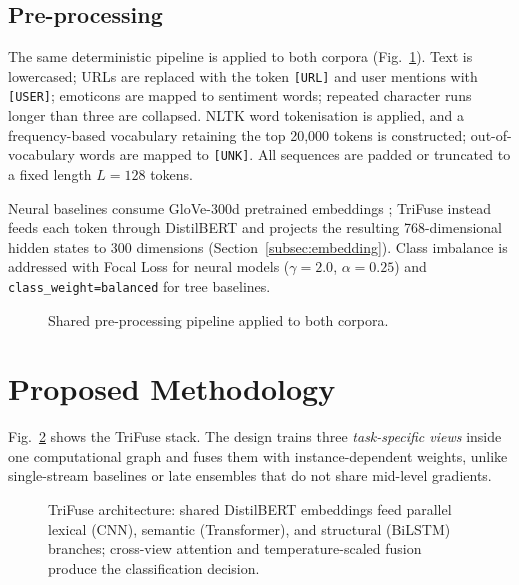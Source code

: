 \documentclass[10pt,twocolumn,a4paper]{article}
\begin{document}
\subsection{Pre-processing}\label{subsec:preprocessing}

The same deterministic pipeline is applied to both corpora (Fig.~\ref{fig:preprocessing}). Text is lowercased; URLs are replaced with the token \texttt{[URL]} and user mentions with \texttt{[USER]}; emoticons are mapped to sentiment words; repeated character runs longer than three are collapsed. NLTK word tokenisation is applied, and a frequency-based vocabulary retaining the top 20,000 tokens is constructed; out-of-vocabulary words are mapped to \texttt{[UNK]}. All sequences are padded or truncated to a fixed length $L{=}128$ tokens.

Neural baselines consume GloVe-300d pretrained embeddings \citep{ref29}; TriFuse instead feeds each token through DistilBERT and projects the resulting 768-dimensional hidden states to 300 dimensions (Section~\ref{subsec:embedding}). Class imbalance is addressed with Focal Loss \citep{ref23} for neural models ($\gamma{=}2.0$, $\alpha{=}0.25$) and \texttt{class\_weight=balanced} for tree baselines.

\begin{figure}[!t]
\centering

\caption{Shared pre-processing pipeline applied to both corpora.}
\label{fig:preprocessing}
\end{figure}

\section{Proposed Methodology}\label{sec:method}

Fig.~\ref{fig:architecture} shows the TriFuse stack. The design trains three \emph{task-specific views} inside one computational graph and fuses them with instance-dependent weights, unlike single-stream baselines \citep{ref7,ref8} or late ensembles \citep{ref14} that do not share mid-level gradients.

\begin{figure}[!t]
\centering

\caption{TriFuse architecture: shared DistilBERT embeddings feed parallel lexical (CNN), semantic (Transformer), and structural (BiLSTM) branches; cross-view attention and temperature-scaled fusion produce the classification decision.}
\label{fig:architecture}
\end{figure}
\end{document}

